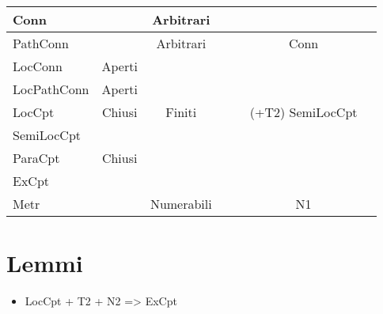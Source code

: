 \documentclass[a4paper,NoNotes,GeneralMath]{stdmdoc}
\newcommand{\Finiti}{Finiti}
\newcommand{\Arbitrari}{Arbitrari}
\newcommand{\Numerabili}{Numerabili}
\newcommand{\rd}[1]{{\color{red} #1 }}
\begin{document}
\begin{tabular}{lcccccc}
	Conn            & \crossmark       & \rd\Arbitrari  &                 & \checkmark             &                   \\ \hline
	PathConn        & \crossmark       & \rd\Arbitrari  &                 & \checkmark             & Conn              \\ \hline
	LocConn         & \rd{Aperti}      &                &                 &                        &                   \\ \hline
	LocPathConn     & \rd{Aperti}      &                &                 &                        &                   \\ \hline

	LocCpt          & \rd{Chiusi}      & \rd\Finiti     &                 &                        & (+T2) SemiLocCpt  \\ \hline
	SemiLocCpt      &                  &                &                 &                        &                   \\ \hline
	ParaCpt         & \rd{Chiusi}      & \rd\crossmark  &                 &                        &                   \\ \hline
	ExCpt           &                  &                &                 &                        &                   \\ \hline

	Metr            & \checkmark       & \rd\Numerabili &                 &                        & N1                \\ \hline
	\end{tabular} \vskip 1.5cm
	
	\section*{Lemmi}
	\begin{itemize}
		\item LocCpt + T2 + N2 => ExCpt
	\end{itemize}
\end{document}
